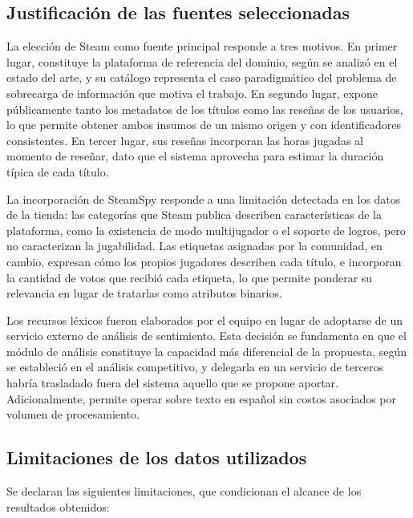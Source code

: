 \subsection{Justificación de las fuentes seleccionadas}\label{subsec:justificacion_fuentes}

La elección de Steam como fuente principal responde a tres motivos. En primer lugar, constituye la plataforma de referencia del dominio, según se analizó en el estado del arte, y su catálogo representa el caso paradigmático del problema de sobrecarga de información que motiva el trabajo. En segundo lugar, expone públicamente tanto los metadatos de los títulos como las reseñas de los usuarios, lo que permite obtener ambos insumos de un mismo origen y con identificadores consistentes. En tercer lugar, sus reseñas incorporan las horas jugadas al momento de reseñar, dato que el sistema aprovecha para estimar la duración típica de cada título.

La incorporación de SteamSpy responde a una limitación detectada en los datos de la tienda: las categorías que Steam publica describen características de la plataforma, como la existencia de modo multijugador o el soporte de logros, pero no caracterizan la jugabilidad. Las etiquetas asignadas por la comunidad, en cambio, expresan cómo los propios jugadores describen cada título, e incorporan la cantidad de votos que recibió cada etiqueta, lo que permite ponderar su relevancia en lugar de tratarlas como atributos binarios.

Los recursos léxicos fueron elaborados por el equipo en lugar de adoptarse de un servicio externo de análisis de sentimiento. Esta decisión se fundamenta en que el módulo de análisis constituye la capacidad más diferencial de la propuesta, según se estableció en el análisis competitivo, y delegarla en un servicio de terceros habría trasladado fuera del sistema aquello que se propone aportar. Adicionalmente, permite operar sobre texto en español sin costos asociados por volumen de procesamiento.

\subsection{Limitaciones de los datos utilizados}\label{subsec:limitaciones_datos}

Se declaran las siguientes limitaciones, que condicionan el alcance de los resultados obtenidos:

